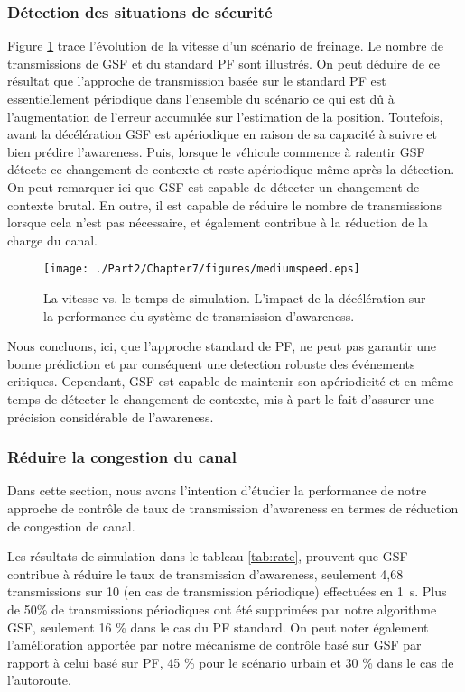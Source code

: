 \subsubsection{Détection des situations de sécurité}
Figure \ref{lightdecc} trace l'évolution de la vitesse d'un scénario de freinage. Le nombre de transmissions de GSF et du standard PF sont illustrés. On peut déduire de ce résultat que l'approche de transmission basée sur le standard PF est essentiellement périodique dans l'ensemble du scénario ce qui est dû à l'augmentation de l'erreur accumulée sur l'estimation de la position. Toutefois, avant la décélération GSF est apériodique en raison de sa capacité à suivre et bien prédire l'awareness. Puis, lorsque le véhicule commence à ralentir GSF détecte ce changement de contexte et reste apériodique m\^eme après la détection.
On peut remarquer ici que GSF est capable de détecter un changement de contexte brutal. En outre, il est capable de réduire le nombre de transmissions lorsque cela n'est pas nécessaire, et également contribue à la réduction de la charge du canal.

\begin{figure}[!h]
\centering
\texttt{[image: ./Part2/Chapter7/figures/mediumspeed.eps]}
\caption{La vitesse vs. le temps de simulation. L'impact de la décélération sur la performance du système de transmission d'awareness.}
\label{lightdecc}
\end{figure}

Nous concluons, ici, que l'approche standard de PF, ne peut pas garantir une bonne prédiction et par conséquent une detection robuste des événements critiques. Cependant, GSF est capable de maintenir son apériodicité et en même temps de détecter le changement de contexte, mis \`a part le fait d'assurer une précision considérable de l'awareness.

\subsubsection{Réduire la congestion du canal}
Dans cette section, nous avons l'intention d'étudier la performance de notre approche de contrôle de taux de transmission d'awareness en termes de réduction de congestion de canal.

Les résultats de simulation dans le tableau \ref{tab:rate}, prouvent que GSF contribue à réduire le taux de transmission d'awareness, seulement 4,68 transmissions sur 10 (en cas de transmission périodique) effectuées en 1~s. Plus de 50\% de transmissions périodiques ont été supprimées par notre algorithme GSF, seulement 16 \% dans le cas du PF standard. On peut noter également l'amélioration apportée par notre mécanisme de contrôle basé sur GSF par rapport à celui basé sur PF, 45 \% pour le scénario urbain et 30 \% dans le cas de l'autoroute.

